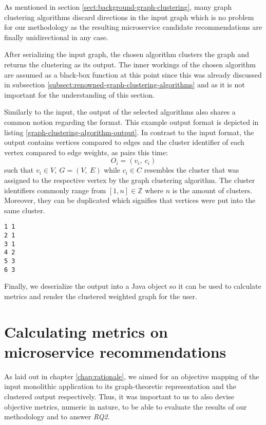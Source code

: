 \documentclass[12pt,a4paper]{report}
\begin{document}
As mentioned in section \ref{sect:background-graph-clustering}, many graph
clustering algorithms discard directions in the input graph which is no problem
for our methodology as the resulting microservice candidate recommendations
are finally unidirectional in any case.

After serializing the input graph, the chosen algorithm clusters the graph
and returns the clustering as its output. The inner workings of the chosen
algorithm are assumed as a black-box function at this point since this was
already discussed in subsection \ref{subsect:renowned-graph-clustering-algorithms}
and as it is not important for the understanding of this section.

Similarly to the input, the output of the selected algorithms also shares
a common notion regarding the format. This example output format is depicted
in listing \ref{graph-clustering-algorithm-output}.
In contrast to the input format, the output contains vertices compared to edges
and the cluster identifier of each vertex compared to edge weights,
as pairs this time:
\[
  O_i = (v_i, \ c_i)
\]
such that \(v_i \in V, \ G = (V, \ E)\) while \(c_i \in C\) resembles the
cluster that was assigned to the respective vertex by the graph clustering
algorithm. The cluster identifiers commonly range from \([1, n] \in \mathbb{Z}\)
where \(n\) is the amount of clusters. Moreover, they can be duplicated
which signifies that vertices were put into the same cluster.

\begin{lstlisting}[caption=Example graph clustering algorithm output, label=graph-clustering-algorithm-output, breaklines=true]
1 1
2 1
3 1
4 2
5 3
6 3
\end{lstlisting}

Finally, we deserialize the output into a Java object so it can be used to
calculate metrics and render the clustered weighted graph for the user.




\chapter{Calculating metrics on microservice recommendations} \label{chap:metrics}

As laid out in chapter \ref{chap:rationale}, we aimed for an objective
mapping of the input monolithic application to its graph-theoretic representation
and the clustered output respectively.
Thus, it was important to us to also devise objective metrics, numeric in nature,
to be able to evaluate the results of our methodology and to answer \textit{RQ2}.
\end{document}
